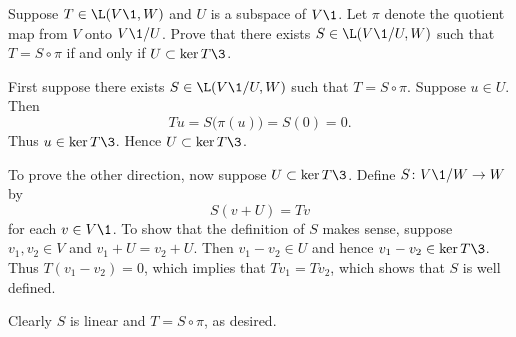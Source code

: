 \exercise
Suppose $T \in \L(V\1, W)$ and $U$ is a subspace of $V\1$. Let $\pi$ denote the quotient map from $V$ onto $V\1/U$. Prove that there exists $S \in \L(V\1/U, W)$ such that $T = S \circ \pi$ if and only if $U \subset \ker T\3$. \label{1715}

\begin{Solution}
First suppose there exists $S \in \L(V\1/U, W)$ such that $T = S \circ \pi$. Suppose $u \in U$. Then
\[
Tu = S\bigl( \pi(u) \bigr) = S(0) = 0.
\]
Thus $u \in \ker T\3$. Hence $U \subset \ker T\3$.

To prove the other direction, now suppose $U \subset \ker T\3$. Define $S \colon V\1/W \to W$ by
\[
S(v+U) = Tv
\]
for each $v \in V\1$. To show that the definition of $S$ makes sense, suppose $v_1, v_2 \in V$ and $v_1 + U = v_2 + U$. Then $v_1 - v_2 \in U$ and hence $v_1 - v_2 \in \ker T\3$. Thus $T(v_1 - v_2) = 0$, which implies that $Tv_1 = Tv_2$, which shows that $S$ is well defined.

Clearly $S$ is linear and $T = S \circ \pi$, as desired.
\end{Solution}

